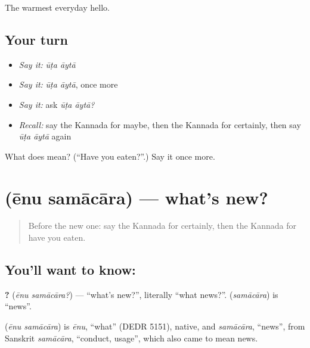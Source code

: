 \begin{grammarlens}[title={What you've built}]
The warmest everyday hello.
\end{grammarlens}

\subsection*{Your turn}
\begin{itemize}
\raggedright
  \item \emph{Say it:} \emph{ūṭa āytā}
  \item \emph{Say it:} \emph{ūṭa āytā}, once more
  \item \emph{Say it:} ask \emph{ūṭa āytā?}
  \item \emph{Recall:} say the Kannada for maybe, then the Kannada for certainly, then say \emph{ūṭa āytā} again
\end{itemize}

\begin{tcolorbox}[breakable,colback=teal!4,colframe=teal!35!black,title={Before you move on}]
What does   mean? (\textquotedblleft{}Have you eaten?\textquotedblright{}.) Say it once more.
\end{tcolorbox}
\section[\texorpdfstring{\kn{ಏನು} \kn{ಸಮಾಚಾರ} (ēnu samācāra)}{ಏನು ಸಮಾಚಾರ (ēnu samācāra)}]{  (ēnu samācāra) — what's new?}

\label{lesson:KA-C96-whatsnew}



\begin{quote}
Before the new one: say the Kannada for certainly, then the Kannada for have you eaten.
\end{quote}

\subsection*{You'll want to know:  }
\textbf{ ?} (\emph{ēnu samācāra?}) — \textquotedblleft{}what's new?\textquotedblright{}, literally \textquotedblleft{}what news?\textquotedblright{}. \textbf{} (\emph{samācāra}) is \textquotedblleft{}news\textquotedblright{}.

\begin{cousinweb}
\textbf{ } (\emph{ēnu samācāra}) is \emph{ēnu}, \textquotedblleft{}what\textquotedblright{} (DEDR 5151), native, and \emph{samācāra}, \textquotedblleft{}news\textquotedblright{}, from Sanskrit \emph{samācāra}, \textquotedblleft{}conduct, usage\textquotedblright{}, which also came to mean news.
\end{cousinweb}

